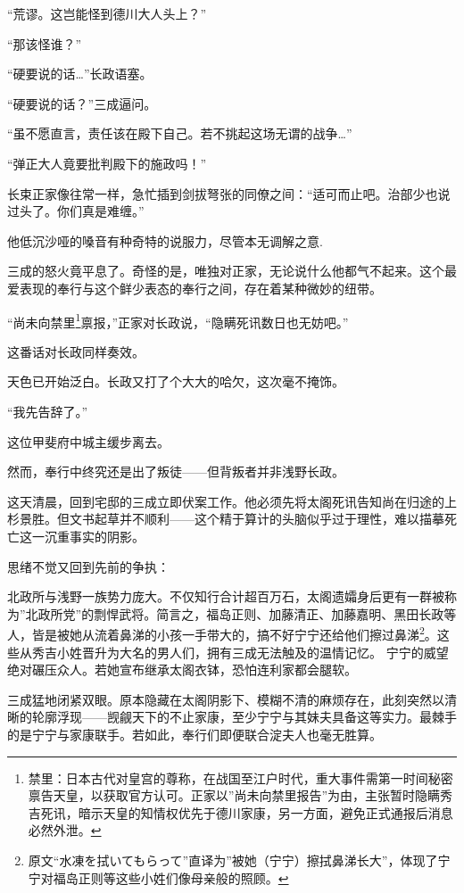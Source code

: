 \documentclass[
]{article}
\begin{document}
``荒谬。这岂能怪到德川大人头上？''

``那该怪谁？''

``硬要说的话\ldots{}''长政语塞。

``硬要说的话？''三成逼问。

``虽不愿直言，责任该在殿下自己。若不挑起这场无谓的战争\ldots{}''

``弹正大人竟要批判殿下的施政吗！''

长束正家像往常一样，急忙插到剑拔弩张的同僚之间：``适可而止吧。治部少也说过头了。你们真是难缠。''

他低沉沙哑的嗓音有种奇特的说服力，尽管本无调解之意.

三成的怒火竟平息了。奇怪的是，唯独对正家，无论说什么他都气不起来。这个最爱表现的奉行与这个鲜少表态的奉行之间，存在着某种微妙的纽带。

``尚未向禁里\footnote{禁里：日本古代对皇宫的尊称，在战国至江户时代，重大事件需第一时间秘密禀告天皇，以获取官方认可。正家以''尚未向禁里报告''为由，主张暂时隐瞒秀吉死讯，暗示天皇的知情权优先于德川家康，另一方面，避免正式通报后消息必然外泄。}禀报，''正家对长政说，``隐瞒死讯数日也无妨吧。''

这番话对长政同样奏效。

天色已开始泛白。长政又打了个大大的哈欠，这次毫不掩饰。

``我先告辞了。''

这位甲斐府中城主缓步离去。

然而，奉行中终究还是出了叛徒------但背叛者并非浅野长政。

这天清晨，回到宅邸的三成立即伏案工作。他必须先将太阁死讯告知尚在归途的上杉景胜。但文书起草并不顺利------这个精于算计的头脑似乎过于理性，难以描摹死亡这一沉重事实的阴影。

思绪不觉又回到先前的争执：

北政所与浅野一族势力庞大。不仅知行合计超百万石，太阁遗孀身后更有一群被称为''北政所党''的剽悍武将。简言之，福岛正则、加藤清正、加藤嘉明、黑田长政等人，皆是被她从流着鼻涕的小孩一手带大的，搞不好宁宁还给他们擦过鼻涕\footnote{原文``水凍を拭いてもらって''直译为''被她（宁宁）擦拭鼻涕长大''，体现了宁宁对福岛正则等这些小姓们像母亲般的照顾。}。这些从秀吉小姓晋升为大名的男人们，拥有三成无法触及的温情记忆。 宁宁的威望绝对碾压众人。若她宣布继承太阁衣钵，恐怕连利家都会腿软。

三成猛地闭紧双眼。原本隐藏在太阁阴影下、模糊不清的麻烦存在，此刻突然以清晰的轮廓浮现------觊觎天下的不止家康，至少宁宁与其妹夫具备这等实力。最棘手的是宁宁与家康联手。若如此，奉行们即便联合淀夫人也毫无胜算。
\end{document}
